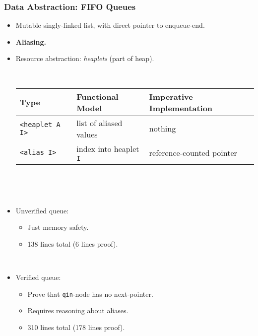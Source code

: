 \documentclass[10pt]{beamer}
\begin{document}
\begin{frame}
\frametitle{Data Abstraction: FIFO Queues}

\begin{itemize}
\item Mutable singly-linked list, with direct pointer to enqueue-end.
\item \textbf{Aliasing.}
\item Resource abstraction: \emph{heaplets} (part of heap).

\ 

{\small
\begin{tabular}{|l|l|l|}
\hline
Type & Functional Model & Imperative Implementation \\
\hline
\texttt{<heaplet A I>} & list of aliased values & nothing\\
\texttt{<alias I>} & index into heaplet \texttt{I} & reference-counted pointer\\
\hline
\end{tabular}}

\ 

\ 

\item Unverified queue:
\begin{itemize}
\item Just memory safety.
\item 138 lines total (6 lines proof).
\end{itemize}

\ 

\item Verified queue:
\begin{itemize}
\item Prove that \texttt{qin}-node has no next-pointer.
\item Requires reasoning about aliases.
\item 310 lines total (178 lines proof).
\end{itemize}

\end{itemize}
\end{frame}
\end{document}
